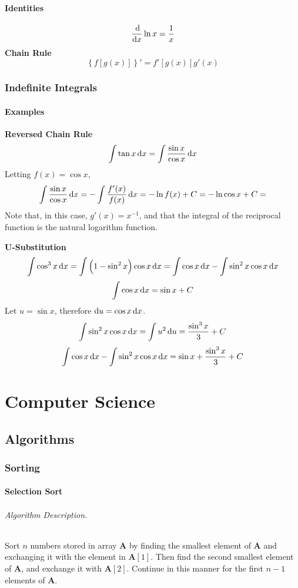 \documentclass[oneside]{book} %
\theoremstyle{plain}
\newcommand*\reciprocal[1]{\frac{1}{#1}}
\begin{document}
\subsection{Identities}
\[\frac{\dif}{\dif x} \ln x = \reciprocal{x}\]
\textbf{Chain Rule}
\[\left\{f\left[g\left(x\right)\right]\right\}'
= f'\left[g\left(x\right)\right] g'\left(x\right)\]

\section{Indefinite Integrals}
\subsection{Examples}
\textbf{Reversed Chain Rule}
\[\int \tan x \dif x = \int \frac{\sin{x}}{\cos{x}} \dif x\]
Letting \(f(x) = \cos x\),
\[\int \frac{\sin{x}}{\cos{x}} \dif x = - \int \frac{f'(x)}{f(x)} \dif x
= - \ln{f(x)} + C = - \ln{\cos x} + C = \]
Note that, in this case, \(g'(x) = x^{-1}\), and that the integral of the
reciprocal function is the natural logarithm function.

\textbf{U-Substitution}
\[\int \cos^3 x \dif x
= \int \left( 1 - \sin^2 x \right) \cos x \dif x
= \int \cos x \dif x - \int \sin^2 x \cos x \dif x\]
\[\int \cos x \dif x = \sin x + C\]
Let \(u = \sin x\), therefore \(\dif u = \cos x \dif x\).
\[\int \sin^2 x \cos x \dif x = \int u^2 \dif u = \frac{\sin^3 x}{3} + C\]
\[\int \cos x \dif x - \int \sin^2 x \cos x \dif x
= \sin x + \frac{\sin^3 x}{3} + C\]

\part{Computer Science}
\chapter{Algorithms}

\section{Sorting}
\subsection{Selection Sort}
\paragraph{Algorithm Description.} Sort \(n\) numbers stored in array
\(\mathbf{A}\) by finding the smallest element of \(\mathbf{A}\) and exchanging
it with the element in \(\mathbf{A}[1]\). Then find the second smallest element
of \(\mathbf{A}\), and exchange it with \(\mathbf{A}[2]\). Continue in this
manner for the first \(n - 1\) elements of \(\mathbf{A}\).
\end{document}
